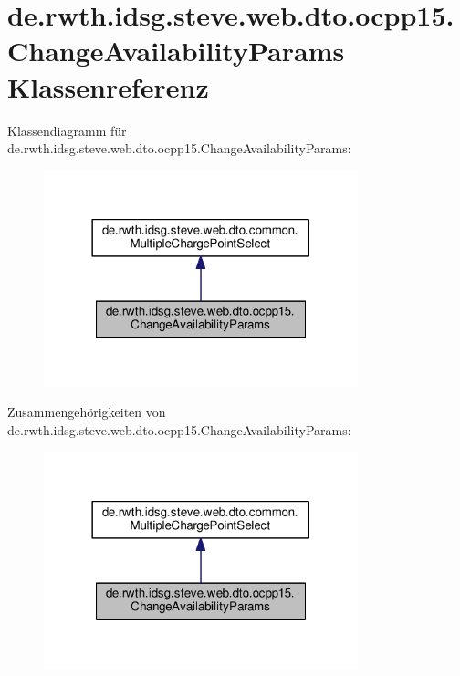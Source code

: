 \hypertarget{classde_1_1rwth_1_1idsg_1_1steve_1_1web_1_1dto_1_1ocpp15_1_1_change_availability_params}{\section{de.\+rwth.\+idsg.\+steve.\+web.\+dto.\+ocpp15.\+Change\+Availability\+Params Klassenreferenz}
\label{classde_1_1rwth_1_1idsg_1_1steve_1_1web_1_1dto_1_1ocpp15_1_1_change_availability_params}
}


Klassendiagramm für de.\+rwth.\+idsg.\+steve.\+web.\+dto.\+ocpp15.\+Change\+Availability\+Params\+:\nopagebreak
\begin{figure}[H]
\begin{center}
\leavevmode
\includegraphics[width=258pt]{classde_1_1rwth_1_1idsg_1_1steve_1_1web_1_1dto_1_1ocpp15_1_1_change_availability_params__inherit__graph}
\end{center}
\end{figure}


Zusammengehörigkeiten von de.\+rwth.\+idsg.\+steve.\+web.\+dto.\+ocpp15.\+Change\+Availability\+Params\+:\nopagebreak
\begin{figure}[H]
\begin{center}
\leavevmode
\includegraphics[width=258pt]{classde_1_1rwth_1_1idsg_1_1steve_1_1web_1_1dto_1_1ocpp15_1_1_change_availability_params__coll__graph}
\end{center}
\end{figure}


